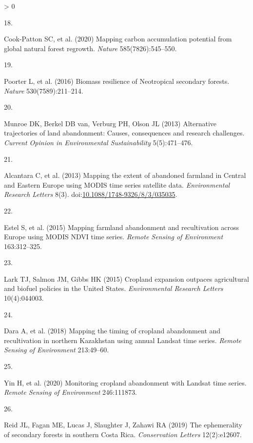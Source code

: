 \documentclass[9pt,twocolumn,twoside,lineno]{pnas-new}
\newlength{\csllabelwidth}
\newlength{\cslhangindent}
\newenvironment{CSLReferences}[2] %
 {%
  \setlength{\parindent}{0pt}
  \ifodd #1 \everypar{\setlength{\hangindent}{\cslhangindent}}\ignorespaces\fi
  \ifnum #2 > 0
  \setlength{\parskip}{#2\baselineskip}
  \fi
 }%
 {}
\newcommand{\CSLLeftMargin}[1]{\parbox[t]{\csllabelwidth}{#1}}
\newcommand{\CSLRightInline}[1]{\parbox[t]{\linewidth - \csllabelwidth}{#1}\break}
\begin{document}
\begin{CSLReferences}{0}{0}
\leavevmode\hypertarget{ref-Cook-Patton2020}{}%
\CSLLeftMargin{18. }
\CSLRightInline{Cook-Patton SC, et al. (2020) {Mapping carbon accumulation potential from global natural forest regrowth}. \emph{Nature} 585(7826):545--550.}

\leavevmode\hypertarget{ref-Poorter2016}{}%
\CSLLeftMargin{19. }
\CSLRightInline{Poorter L, et al. (2016) {Biomass resilience of Neotropical secondary forests}. \emph{Nature} 530(7589):211--214.}

\leavevmode\hypertarget{ref-Munroe2013}{}%
\CSLLeftMargin{20. }
\CSLRightInline{Munroe DK, Berkel DB van, Verburg PH, Olson JL (2013) {Alternative trajectories of land abandonment: Causes, consequences and research challenges}. \emph{Current Opinion in Environmental Sustainability} 5(5):471--476.}

\leavevmode\hypertarget{ref-Alcantara2013}{}%
\CSLLeftMargin{21. }
\CSLRightInline{Alcantara C, et al. (2013) {Mapping the extent of abandoned farmland in Central and Eastern Europe using MODIS time series satellite data}. \emph{Environmental Research Letters} 8(3). doi:\href{https://doi.org/10.1088/1748-9326/8/3/035035}{10.1088/1748-9326/8/3/035035}.}

\leavevmode\hypertarget{ref-Estel2015}{}%
\CSLLeftMargin{22. }
\CSLRightInline{Estel S, et al. (2015) {Mapping farmland abandonment and recultivation across Europe using MODIS NDVI time series}. \emph{Remote Sensing of Environment} 163:312--325.}

\leavevmode\hypertarget{ref-Lark2015}{}%
\CSLLeftMargin{23. }
\CSLRightInline{Lark TJ, Salmon JM, Gibbs HK (2015) {Cropland expansion outpaces agricultural and biofuel policies in the United States}. \emph{Environmental Research Letters} 10(4):044003.}

\leavevmode\hypertarget{ref-Dara2018}{}%
\CSLLeftMargin{24. }
\CSLRightInline{Dara A, et al. (2018) {Mapping the timing of cropland abandonment and recultivation in northern Kazakhstan using annual Landsat time series}. \emph{Remote Sensing of Environment} 213:49--60.}

\leavevmode\hypertarget{ref-Yin2020}{}%
\CSLLeftMargin{25. }
\CSLRightInline{Yin H, et al. (2020) {Monitoring cropland abandonment with Landsat time series}. \emph{Remote Sensing of Environment} 246:111873.}

\leavevmode\hypertarget{ref-Reid2019}{}%
\CSLLeftMargin{26. }
\CSLRightInline{Reid JL, Fagan ME, Lucas J, Slaughter J, Zahawi RA (2019) {The ephemerality of secondary forests in southern Costa Rica}. \emph{Conservation Letters} 12(2):e12607.}


\end{CSLReferences}
\end{document}
